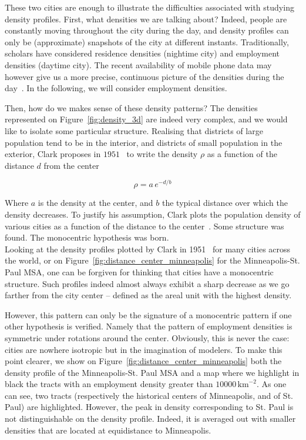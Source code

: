 These two cities are enough to illustrate the difficulties associated with
studying density profiles. First, what densities we are talking about? Indeed,
people are constantly moving throughout the city during the day, and density
profiles can only be (approximate) snapshots of the city at different instants.
Traditionally, scholars have considered residence densities (nightime city) and
employment densities (daytime city). The recent availability of mobile phone
data may however give us a more precise, continuous picture of the densities
during the day~\cite{Louail:2014}. In the following, we will consider employment
densities.


Then, how do we makes sense of these density patterns? The densities represented
on Figure~\ref{fig:density_3d} are indeed very complex, and we would like to
isolate some particular structure. Realising that districts of large population
tend to be in the interior, and districts of small population in the exterior, Clark
proposes in $1951$~\cite{Clark:1951} to write the density $\rho$ as a function
of the distance $d$ from the center

\begin{equation}
    \rho = a\,e^{-d/b} 
\end{equation}

Where $a$ is the density at the center, and $b$ the typical distance over which
the density decreases. To justify his assumption, Clark plots the population
density of various cities as a function of the distance to the
center~\cite{Clark:1951}. Some structure was found. The monocentric hypothesis
was born.\\

Looking at the density profiles plotted by Clark in 1951~\cite{Clark:1951} for
many cities across the world, or on Figure~\ref{fig:distance_center_minneapolis}
for the Minneapolis-St. Paul MSA, one can be
forgiven for thinking that cities have a monocentric structure. Such profiles
indeed almost always exhibit a sharp decrease as we go farther from the city
center -- defined as the areal unit with the highest density. 

However, this pattern can only be the signature of a monocentric pattern if one
other hypothesis is verified. Namely that the pattern of employment densities is
symmetric under rotations around the center. Obviously, this is never the case:
cities are nowhere isotropic but in the imagination of modelers. To make this
point clearer, we show on Figure~\ref{fig:distance_center_minneapolis} both the
density profile of the Minneapolis-St. Paul MSA and a map where we highlight in
black the tracts with an employment density greater than
$10000\,\text{km}^{-2}$. As one can see, two tracts (respectively the historical
centers of Minneapolis, and of St. Paul) are highlighted. However, the peak in
density corresponding to St. Paul is not distinguishable on the density profile.
Indeed, it is averaged out with smaller densities that are located at
equidistance to Minneapolis.

